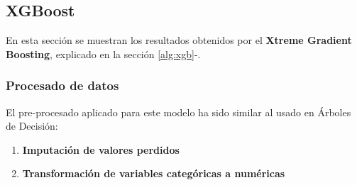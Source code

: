 \subsection{XGBoost}
En esta sección se muestran los resultados obtenidos por el \textbf{Xtreme Gradient Boosting}, explicado en la sección \ref{alg:xgb}-.
\subsubsection*{Procesado de datos}
El pre-procesado aplicado para este modelo ha sido similar al usado en Árboles de Decisión:
\begin{enumerate}
	\item \textbf{Imputación de valores perdidos}
	\item \textbf{Transformación de variables categóricas a numéricas}
\end{enumerate}
